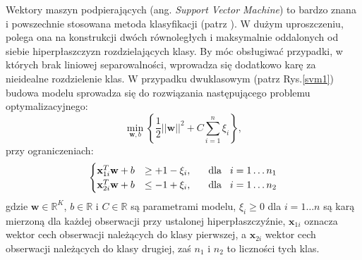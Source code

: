 \documentclass{mini}
\begin{document}
Wektory maszyn podpierających (ang. \textit{Support Vector Machine}) to bardzo znana i powszechnie stosowana metoda klasyfikacji (patrz \cite{koronacki}). W dużym uproszczeniu, polega ona na konstrukcji dwóch równoległych i maksymalnie oddalonych od siebie hiperpłaszczyzn rozdzielających klasy. By móc obsługiwać przypadki, w których brak liniowej separowalności, wprowadza się dodatkowo karę za nieidealne rozdzielenie klas. W przypadku dwuklasowym (patrz Rys.\ref{svm1}) budowa modelu sprowadza się do rozwiązania następującego problemu optymalizacyjnego:
$$
\min_{\mathbf{w}, b}\left\lbrace\dfrac{1}{2}||\textbf{w}||^2+C\sum_{i=1}^{n}\xi_i\right\rbrace,
$$
przy ograniczeniach:
$$
\begin{cases}
\mathbf{x}^T_{1i}\textbf{w}+b &\geq +1-\xi_i, \hspace{6mm} \text{dla}\hspace{3mm}i=1\ldots n_1 \\
\mathbf{x}^T_{2i}\textbf{w}+b &\leq -1+\xi_i, \hspace{6mm} \text{dla}\hspace{3mm}i=1\ldots n_2
\end{cases}
$$    
gdzie $\mathbf{w}\in\mathbb{R}^K$, $b\in\mathbb{R}$ i $C\in\mathbb{R}$ są parametrami modelu, $\xi_i\geq 0$ dla $i=1\ldots n$ są karą mierzoną dla każdej obserwacji przy ustalonej hiperpłaszczyźnie, $\mathbf{x}_{1i}$ oznacza wektor cech obserwacji należących do klasy pierwszej, a $\mathbf{x}_{2i}$ wektor cech obserwacji należących do klasy drugiej, zaś $n_1$ i $n_2$ to liczności tych klas. 
\end{document}
